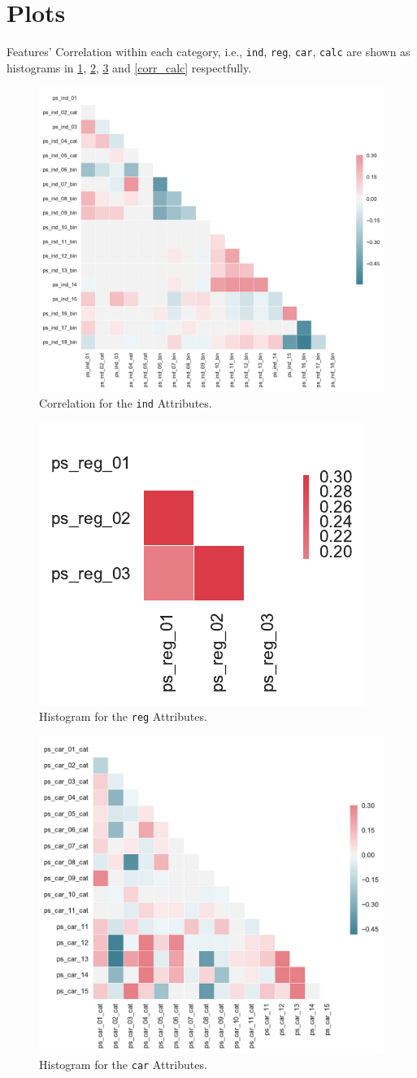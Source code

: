 \documentclass{standalone}
\begin{document}
\appendix

\section{Plots}

Features' Correlation within each category, i.e., \lstinline{ind},
\lstinline{reg}, \lstinline{car}, \lstinline{calc} are shown as histograms in
\cref{corr_ind}, \cref{corr_reg}, \cref{corr_car} and \cref{corr_calc}
respectfully.

\begin{figure}[!b]
\centering
\includegraphics[width=.5\textwidth]{fig/corr_ind_col.pdf}
\caption{Correlation for the \lstinline{ind} Attributes.}
\label{corr_ind}
\end{figure}

\begin{figure}[!bt]
\centering
\includegraphics[width=.2\textwidth]{fig/corr_reg_col.pdf}
\caption{Histogram for the \lstinline{reg} Attributes.}
\label{corr_reg}
\end{figure}

\begin{figure}[!bt]
\centering
\includegraphics[width=.5\textwidth]{fig/corr_car_col.pdf}
\caption{Histogram for the \lstinline{car} Attributes.}
\label{corr_car}
\end{figure}
\end{document}
